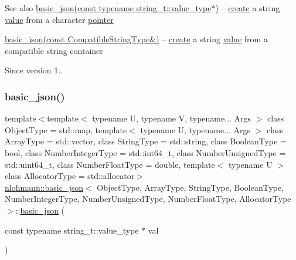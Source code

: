 \begin{DoxySeeAlso}{See also}
\hyperlink{classnlohmann_1_1basic__json_a3654da9a84deaf61899c4eee5b93c2c5}{basic\+\_\+json(const typename string\+\_\+t\+::value\+\_\+type$\ast$)} -- \hyperlink{classnlohmann_1_1basic__json_afdb7a485369fbfd8c4c7c134ebb1feb5}{create} a string \hyperlink{classnlohmann_1_1basic__json_a407e73a037e6e3067ef7aa2c25a79f39}{value} from a character \hyperlink{classnlohmann_1_1basic__json_a9d1b58099dc64695fcf2847ab0b2a7c7}{pointer} 

\hyperlink{classnlohmann_1_1basic__json_ae85d91b0620650bcd9993e09d0e287d9}{basic\+\_\+json(const Compatible\+String\+Type\&)} -- \hyperlink{classnlohmann_1_1basic__json_afdb7a485369fbfd8c4c7c134ebb1feb5}{create} a string \hyperlink{classnlohmann_1_1basic__json_a407e73a037e6e3067ef7aa2c25a79f39}{value} from a compatible string container
\end{DoxySeeAlso}
\begin{DoxySince}{Since}
version 1.. 
\end{DoxySince}
\hypertarget{classnlohmann_1_1basic__json_a3654da9a84deaf61899c4eee5b93c2c5}{}\label{classnlohmann_1_1basic__json_a3654da9a84deaf61899c4eee5b93c2c5} 
\subsubsection{\texorpdfstring{basic\+\_\+json()}{basic\_json()}\hspace{0.1cm}{\footnotesize\ttfamily [8/23]}}
{\footnotesize\ttfamily template$<$template$<$ typename U, typename V, typename... Args $>$ class Object\+Type = std\+::map, template$<$ typename U, typename... Args $>$ class Array\+Type = std\+::vector, class String\+Type  = std\+::string, class Boolean\+Type  = bool, class Number\+Integer\+Type  = std\+::int64\+\_\+t, class Number\+Unsigned\+Type  = std\+::uint64\+\_\+t, class Number\+Float\+Type  = double, template$<$ typename U $>$ class Allocator\+Type = std\+::allocator$>$ \\
\hyperlink{classnlohmann_1_1basic__json}{nlohmann\+::basic\+\_\+json}$<$ Object\+Type, Array\+Type, String\+Type, Boolean\+Type, Number\+Integer\+Type, Number\+Unsigned\+Type, Number\+Float\+Type, Allocator\+Type $>$\+::\hyperlink{classnlohmann_1_1basic__json}{basic\+\_\+json} (\begin{DoxyParamCaption}\item[{const typename string\+\_\+t\+::value\+\_\+type $\ast$}]{val }\end{DoxyParamCaption})\hspace{0.3cm}{\ttfamily [inline]}}



